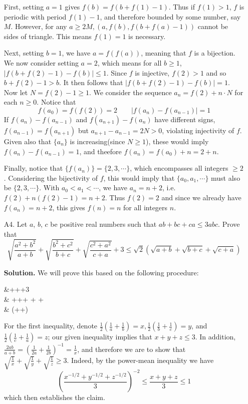 \documentclass[11pt,a4paper]{article}
\begin{document}
\begin{enumerate}
		First, setting $a = 1$ gives $f(b) = f(b + f(1) - 1)$. 
		Thus if $f(1) > 1$, $f$ is periodic with period $f(1) - 1$, and therefore bounded by some number, say $M$. 
		However, for any $a \ge 2M, (a, f(b), f(b+f(a)-1))$ cannot be sides of triangle. 
		This means $f(1)=1$ is necessary. 
		
		Next, setting $b = 1$, we have $a = f(f(a))$, meaning that $f$ is a bijection. 
		We now consider setting $a=2$, which means for all $b\ge 1$, 
		$|f(b + f(2) - 1) - f(b)|\le 1$. 
		Since $f$ is injective, $f(2)>1$ and so $b + f(2)-1 > b$. 
		It then follows that $|f(b + f(2) - 1) - f(b)| = 1$. 
		Now let $N = f(2) - 1\ge 1$. We consider the sequence $a_n = f(2) + n\cdot N$ for each $n\ge 0$. 
		Notice that 
		\[
		f(a_0) = f(f(2)) = 2
		\qquad 
		|f(a_n) - f(a_{n-1})| = 1
		\]
		If $f(a_n) - f(a_{n-1})$ and $f(a_{n+1}) - f(a_{n})$ have different signs, 
		$f(a_{n-1}) = f(a_{n+1})$ but $a_{n+1}-a_{n-1}=2N>0$, 
		violating injectivity of $f$. 
		Given also that $\{a_n\}$ is increasing(since $N\ge 1$), 
		these would imply $f(a_n) - f(a_{n-1}) = 1$, and theefore $f(a_n) = f(a_0) + n = 2 + n$. 
		
		Finally, notice that $\{f(a_n)\}=\{2, 3, \cdots\}$, which encompasses all integers $\ge 2$. 
		Considering the bijectivity of $f$, this would imply that $\{a_0, a_1, \cdots\}$ must also be $\{2, 3, \cdots\}$. 
		With $a_0 < a_1 < \cdots$, we have $a_n = n + 2$, i.e. $f(2) + n(f(2)-1)=n+2$. 
		Thus $f(2)=2$ and since we already have $f(a_n) = n + 2$, this gives $f(n) = n$ for all integers $n$. 
		
		\item [A4.]
		Let $a$, $b$, $c$ be positive real numbers such that $ab+bc+ca\leq 3abc$. Prove that
		\[\sqrt{\frac{a^2+b^2}{a+b}}+\sqrt{\frac{b^2+c^2}{b+c}}+\sqrt{\frac{c^2+a^2}{c+a}}+3\leq \sqrt{2}\left(\sqrt{a+b}+\sqrt{b+c}+\sqrt{c+a}\right)\]
		
		\textbf{Solution.} 
		We will prove this based on the following procedure: 
		\begin{flalign*}
			&+++3
			\\\le & +++
			+  + 
			\\\le &  \left(++\right)
		\end{flalign*}
	    For the first inequality, denote $\frac 12(\frac{1}{a} + \frac{1}{b}) = x, 
	    \frac 12(\frac{1}{b}+\frac{1}{c}) = y$, 
	    and $\frac 12 (\frac{1}{c} + \frac{1}{a}) = z$; 
	    our given inequality implies that $x + y + z\le 3$. 
	    In addition, $\frac{2ab}{a + b} = (\frac{1}{2a}+\frac{1}{2b})^{-1} = \frac 1x$, and therefore we are to show that $\sqrt{\frac 1x} + \sqrt{\frac 1y} + \sqrt{\frac 1z}\ge 3$. 
	    Indeed, by the power-mean inequality we have 
	    \[
	    (\frac{x^{-1/2} + y ^{-1/2} + z^{-1/2}}{3})^{-2}\le \frac{x + y + z}{3}\le 1
	    \]
	    which then establishes the claim. 
	    

\end{enumerate}
\end{document}
